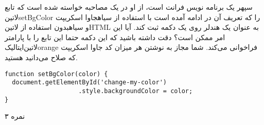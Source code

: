 
سپهر یک برنامه نویس فرانت است، از او در یک مصاحبه خواسته شده است
که تابع ‌لاتین{setBgColor}
را که تعریف آن در ادامه آمده است با استفاده از ‌سیاه{جاوا اسکریپت}
و ‌سیاه{بدون}
استفاده از ‌لاتین{HTML}
به عنوان یک هندلر روی یک دکمه ثبت کند. آیا این امر ممکن است؟
دقت داشته باشید که این دکمه حتما این تابع را با پارامتر ‌لاتین{‌ایتالیک{orange}}
فراخوانی می‌کند.
شما مجاز به نوشتن هر میزان کد جاوا اسکریپت که صلاح می‌دانید هستید.

\begin{latin}
\begin{verbatim}
function setBgColor(color) {
  document.getElementById('change-my-color')
                    .style.backgroundColor = color;
}
\end{verbatim}
\end{latin}

۳ نمره


